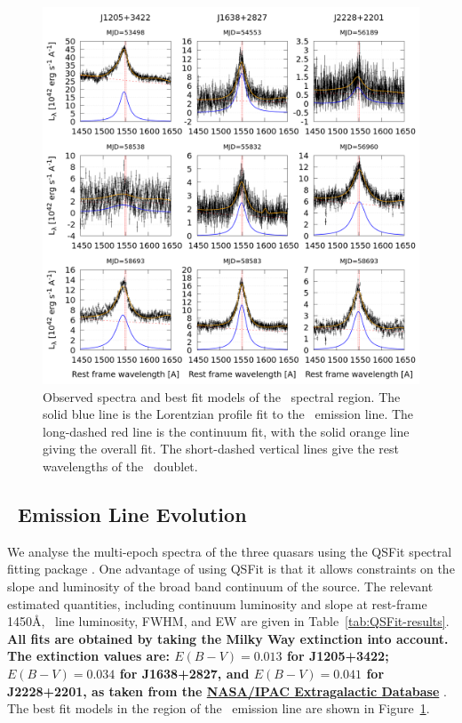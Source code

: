\documentclass[fleqn,usenatbib]{mnras}
\begin{document}
\begin{figure}
  \centering
  \includegraphics[width=18.40cm, trim=0.37cm 0.3cm 0.0cm 0.2cm, clip]{figures/CIVregions.png}
    \vspace{-18pt}
  \caption{Observed spectra and best fit models of the \civ\ spectral region.
    The solid blue line is the Lorentzian profile fit to the \civ\ emission line.
    The long-dashed red line is the continuum fit, with the solid orange
    line giving the overall fit. The short-dashed vertical lines give the
    rest wavelengths of the \civ\ doublet. }
  \label{fig:QSFit-CIV}
\end{figure}

\subsection{\civ\ Emission Line Evolution}
We analyse the multi-epoch spectra of the three quasars using the
QSFit spectral fitting package \citep{Calderone2017}.  One advantage
of using QSFit is that it allows constraints on the slope and
luminosity of the broad band continuum of the source. The relevant
estimated quantities, including continuum luminosity and slope at
rest-frame 1450\AA, \civ\ line luminosity, FWHM, and EW are given in
Table~\ref{tab:QSFit-results}.  {\bf All fits are obtained by taking
the Milky Way extinction \citep{Schlafly2011} into account.  The
extinction values are: $E(B-V) =0.013$ for J1205+3422; $E(B-V) =0.034$
for J1638+2827, and $E(B-V) =0.041$ for J2228+2201, as taken from the
\href{http://ned.ipac.caltech.edu/}{NASA/IPAC Extragalactic Database} 
}. The best fit models in the region of the \civ\ emission line are
shown in Figure~\ref{fig:QSFit-CIV}.
\end{document}
